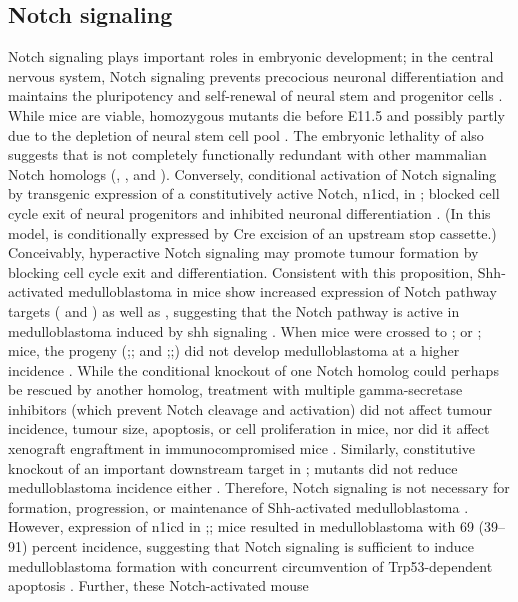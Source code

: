 \subsection{Notch signaling}

Notch signaling plays important roles in embryonic development; in the central nervous system, Notch signaling prevents precocious neuronal differentiation and maintains the pluripotency and self-renewal of neural stem and progenitor cells . While \high{+/-} mice are viable, homozygous  mutants die before E11.5 and possibly partly due to the depletion of neural stem cell pool . The embryonic lethality of \high{-/-} also suggests that  is not completely functionally redundant with other mammalian Notch homologs (, , and ). Conversely, conditional activation of Notch signaling by transgenic expression of a constitutively active Notch, \gls{n1icd}, in ; blocked cell cycle exit of neural progenitors and inhibited neuronal differentiation . (In this model,  is conditionally expressed by Cre excision of an upstream stop cassette.) Conceivably, hyperactive Notch signaling may promote tumour formation by blocking cell cycle exit and differentiation. Consistent with this proposition, Shh-activated medulloblastoma in  mice show increased expression of Notch pathway targets ( and ) as well as , suggesting that the Notch pathway is active in medulloblastoma induced by \gls{shh} signaling . When  mice were crossed to ; or ; mice, the progeny (;; and ;;) did not develop medulloblastoma at a higher incidence . While the conditional knockout of one Notch homolog could perhaps be rescued by another homolog, treatment with multiple gamma-secretase inhibitors (which prevent Notch cleavage and activation) did not affect tumour incidence, tumour size, apoptosis, or cell proliferation in  mice, nor did it affect xenograft engraftment in immunocompromised mice . Similarly, constitutive knockout of an important downstream target  in ;\high{-/-} mutants did not reduce medulloblastoma incidence either . Therefore, Notch signaling is not necessary for formation, progression, or maintenance of Shh-activated medulloblastoma . However, expression of \gls{n1icd} in ;;\high{-/-} mice resulted in medulloblastoma with 69 (39--91) percent incidence, suggesting that Notch signaling is sufficient to induce medulloblastoma formation with concurrent circumvention of Trp53-dependent apoptosis . Further, these Notch-activated mouse 